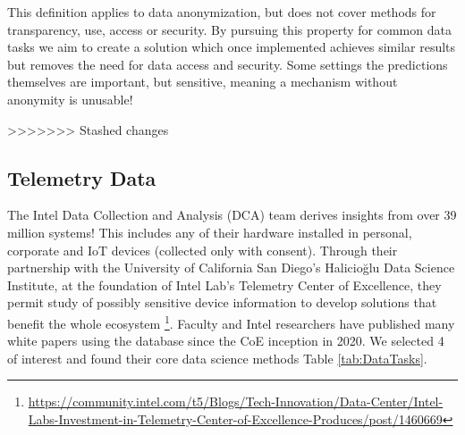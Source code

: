 \documentclass[12pt,letterpaper]{article}
\begin{document}
\begin{table}[h]
This definition applies to data anonymization, but does not cover methods for transparency, use, access or security. By pursuing this property for common data tasks we aim to create a solution which once implemented achieves similar results but removes the need for data access and security. Some settings the predictions themselves are important, but sensitive, meaning a mechanism without anonymity is unusable!

>>>>>>> Stashed changes
\subsection{Telemetry Data}

The Intel Data Collection and Analysis (DCA) team derives insights from over 39 million systems! This includes any of their hardware installed in personal, corporate and IoT devices (collected only with consent). Through their partnership with the University of California San Diego's Halicioğlu Data Science Institute, at the foundation of Intel Lab's Telemetry Center of Excellence, they permit study of possibly sensitive device information to develop solutions that benefit the whole ecosystem \footnote{\url{https://community.intel.com/t5/Blogs/Tech-Innovation/Data-Center/Intel-Labs-Investment-in-Telemetry-Center-of-Excellence-Produces/post/1460669}}. Faculty and Intel researchers have published many white papers using the database since the CoE inception in 2020. We selected 4 of interest and found their core data science methods Table \ref{tab:DataTasks}.


\end{table}
\end{document}
